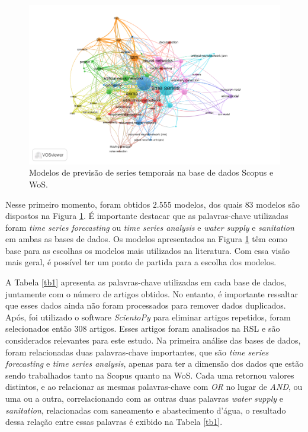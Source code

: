 \begin{figure}[!htb]
	\centering
	\caption{Modelos de previsão de series temporais na base de dados Scopus e WoS.}
	\label{fig:scopus-09-08}
	\includegraphics[width=\linewidth]{Revisao/Figuras/base-wos-scopus.pdf}
	
	
\end{figure}

Nesse primeiro momento, foram obtidos $2.555$ modelos, dos quais $83$ modelos são dispostos na Figura \ref{fig:scopus-09-08}. É importante destacar que as palavras-chave utilizadas foram \textit{time series forecasting} ou \textit{time series analysis} e \textit{water supply} e \textit{sanitation} em ambas as bases de dados. Os modelos apresentados na Figura \ref{fig:scopus-09-08} têm como base para as escolhas os modelos mais utilizados na literatura. Com essa visão mais geral, é possível ter um ponto de partida para a escolha dos modelos.

A Tabela \ref{tb1} apresenta as palavras-chave utilizadas em cada base de dados, juntamente com o número de artigos obtidos. No entanto, é importante ressaltar que esses dados ainda não foram processados para remover dados duplicados. Após, foi utilizado o software \textit{ScientoPy} para eliminar artigos repetidos, foram selecionados então $308$ artigos. Esses artigos foram analisados na RSL e são considerados relevantes para este estudo. Na primeira análise das bases de dados, foram relacionadas duas palavras-chave importantes, que são \textit{time series forecasting} e \textit{time series analysis}, apenas para ter a dimensão dos dados que estão sendo trabalhados tanto na Scopus quanto na WoS. Cada uma retornou valores distintos, e ao relacionar as mesmas palavras-chave com \textit{OR} no lugar de \textit{AND}, ou uma ou a outra, correlacionando com as outras duas palavras \textit{water supply} e \textit{sanitation}, relacionadas com saneamento e abastecimento d'água, o resultado dessa relação entre essas palavras é exibido na Tabela \ref{tb1}.

